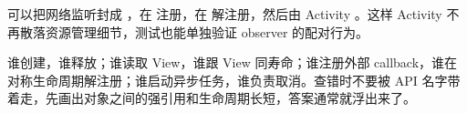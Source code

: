 \begin{followup}
可以把网络监听封成 ，在  注册，在  解注册，然后由 Activity 。这样 Activity 不再散落资源管理细节，测试也能单独验证 observer 的配对行为。
\end{followup}

\begin{keypoint}[生命周期所有权口诀]
谁创建，谁释放；谁读取 View，谁跟 View 同寿命；谁注册外部 callback，谁在对称生命周期解注册；谁启动异步任务，谁负责取消。查错时不要被 API 名字带着走，先画出对象之间的强引用和生命周期长短，答案通常就浮出来了。
\end{keypoint}
